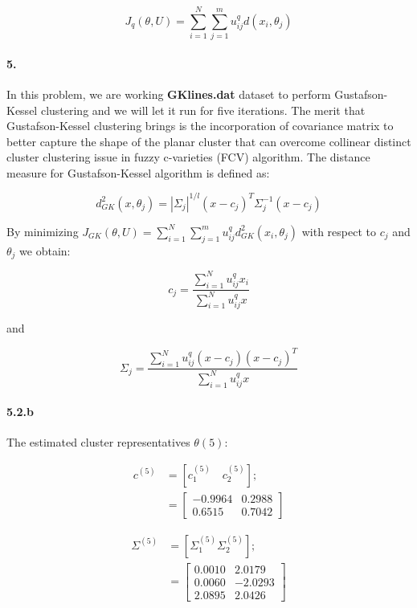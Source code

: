 \documentclass[a4paper]{article}
\begin{document}
	\begin{equation}
		J_q(\theta, U) = \sum_{i=1}^N \sum_{j=1}^m u_{ij}^q d(x_i, \theta_j)
	\end{equation}
	
\paragraph{5.} In this problem, we are working \textbf{GKlines.dat} dataset to perform Gustafson-Kessel clustering and we will let it run for five iterations. The merit that Gustafson-Kessel clustering brings is the incorporation of covariance matrix to better capture the shape of the planar cluster that can overcome collinear distinct cluster clustering issue in fuzzy c-varieties (FCV) algorithm. The distance measure for Gustafson-Kessel algorithm is defined as:

	\begin{equation}
		d^2_{GK}(x,\theta_j) = |\Sigma_j|^{1/l} (x-c_j)^T \Sigma_j^{-1} (x-c_j)
	\end{equation}
	
	By minimizing $J_{GK}(\theta, U) = \sum_{i=1}^N \sum_{j=1}^m u_{ij}^q d^2_{GK}(x_i,\theta_j)$ with respect to $c_j$ and $\theta_j$ we obtain:
	
	\begin{equation}
		c_j = \frac{\sum_{i=1}^N u^q_{ij}x_i}{\sum_{i=1}^N u^q_{ij}x}
	\end{equation}
	
	and
	
	\begin{equation}
		\Sigma_j = \frac{\sum_{i=1}^N u^q_{ij}(x-c_j)(x-c_j)^T}{\sum_{i=1}^N u^q_{ij}x}
	\end{equation}
	
\paragraph{5.2.b} The estimated cluster representatives $\theta(5)$:
	
	\begin{align}
		c^{(5)} &= [c_1^{(5)} \quad c_2^{(5)}]; \\
			&= \begin{bmatrix}
				-0.9964  &  0.2988 \\
    			 0.6515  &  0.7042
			\end{bmatrix}
	\end{align}
	
	\begin{align}
		\Sigma^{(5)} &= [\Sigma_1^{(5)} \Sigma_2^{(5)}]; \\
			&= \begin{bmatrix}
				0.0010  &  2.0179 \\
    			0.0060  & -2.0293 \\
    			2.0895  &  2.0426
			\end{bmatrix}
	\end{align}
	
\end{document}
